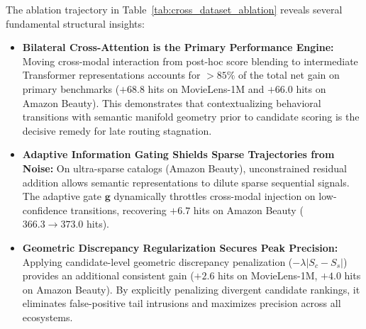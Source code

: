 The ablation trajectory in Table~\ref{tab:cross_dataset_ablation} reveals several fundamental structural insights:
\begin{itemize}[leftmargin=*]
    \item \textbf{Bilateral Cross-Attention is the Primary Performance Engine:} Moving cross-modal interaction from post-hoc score blending to intermediate Transformer representations accounts for $>85\%$ of the total net gain on primary benchmarks ($+68.8$ hits on MovieLens-1M and $+66.0$ hits on Amazon Beauty). This demonstrates that contextualizing behavioral transitions with semantic manifold geometry prior to candidate scoring is the decisive remedy for late routing stagnation.
    \item \textbf{Adaptive Information Gating Shields Sparse Trajectories from Noise:} On ultra-sparse catalogs (Amazon Beauty), unconstrained residual addition allows semantic representations to dilute sparse sequential signals. The adaptive gate $\mathbf{g}$ dynamically throttles cross-modal injection on low-confidence transitions, recovering $+6.7$ hits on Amazon Beauty ($366.3 \to 373.0$ hits).
    \item \textbf{Geometric Discrepancy Regularization Secures Peak Precision:} Applying candidate-level geometric discrepancy penalization ($-\lambda |S_c - S_s|$) provides an additional consistent gain ($+2.6$ hits on MovieLens-1M, $+4.0$ hits on Amazon Beauty). By explicitly penalizing divergent candidate rankings, it eliminates false-positive tail intrusions and maximizes precision across all ecosystems.
\end{itemize}
